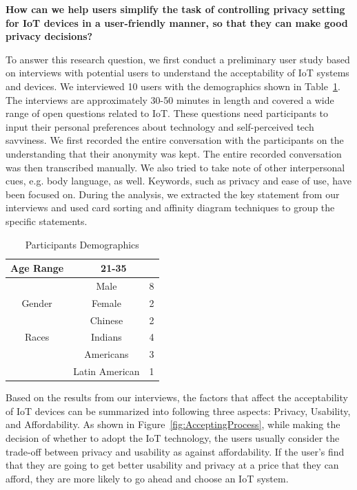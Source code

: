                   \textbf{How can we help users simplify the task of controlling privacy setting for IoT devices in a user-friendly manner, 
                  so that they can make good privacy decisions?}

To answer this research question, we first conduct a preliminary user study based on interviews with potential users to understand the acceptability of IoT systems and devices. We interviewed 10 users with the demographics shown in Table~\ref{tab:demographics1}. The interviews are approximately 30-50 minutes in length and covered a wide range of open questions related to IoT. These questions need participants to input their personal preferences about technology and self-perceived tech savviness. We first recorded the entire conversation with the participants on the understanding that their anonymity was kept. The entire recorded conversation was then transcribed manually. We also tried to take note of other interpersonal cues, e.g. body language, as well. Keywords, such as privacy and ease of use, have been focused on. During the analysis, we extracted the key statement from our interviews and used card sorting and affinity diagram techniques to group the specific statements.

\begin {table}
\caption {Participants Demographics} \label{tab:demographics1}
\vspace{8pt}
\begin{center}
	\begin{tabular}{|c|c|c|}
		\hline
		Age Range & \multicolumn{2}{c|}{ 21-35 }\\
		\hline
		& Male & 8 \\
		\cline{2-3}
		Gender    & Female & 2 \\
		\hline
		& Chinese & 2 \\
		\cline{2-3}
		Races 	  & Indians & 4 \\
		\cline{2-3}
		& Americans & 3 \\
		\cline{2-3}
		& Latin American & 1\\
		\hline
	\end{tabular}
\end{center}
\end {table}

Based on the results from our interviews, the factors that affect the acceptability of IoT devices can be summarized into following three aspects: Privacy, Usability, and Affordability. As shown in Figure~\ref{fig:AcceptingProcess}, while making the decision of whether to adopt the IoT technology, the users usually consider the trade-off between privacy and usability as against affordability. If the user's find that they are going to get better usability and privacy at a price that they can afford, they are more likely to go ahead and choose an IoT system. 


